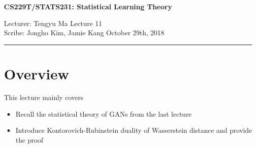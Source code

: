 \documentclass[11pt]{article}
\newcommand{\1}{\mathbb{I}} %
\newcommand{\draftnotice}{\vbox to 0.25in{\noindent
   \raisebox{0.6in}[0in][0in]{\makebox[\textwidth][r]{\it
    DRAFT --- a final version will be posted shortly}}}
   \vspace{-.25in}\vspace{-\baselineskip}
}
\begin{document}
\thispagestyle{empty}


\begin{center}
\bf\large CS229T/STATS231: Statistical Learning Theory
\end{center}

\noindent
Lecturer: Tengyu Ma   %
\hfill
Lecture 11               %
\\
Scribe: Jongho Kim, Jamie Kang                  %
\hfill
October 29th, 2018           %

\noindent
\rule{\textwidth}{1pt}

\medskip


\section{Overview}
This lecture mainly covers\textbf{}
\begin{itemize}
	\item Recall the statistical theory of GANs from the last lecture
	\item Introduce Kontorovich-Rubinstein duality of Wasserstein distance and provide the proof
\end{itemize}  
\end{document}
